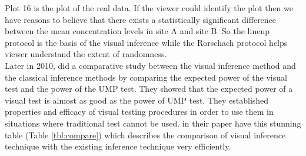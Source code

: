 \documentclass[12]{report}
\begin{document}
Plot 16 is the plot of the real data. If the viewer could identify the plot then we have reasons to believe that there exists a statistically significant difference between the mean concentration levels in site A and site B. So the lineup protocol is the basis of the visual inference while the Rorschach protocol helps viewer understand the extent of randomness. \\

Later in 2010, \cite{majumder:2010} did a comparative study between the visual inference method and the classical inference methods by comparing the expected power of the visual test and the power of the UMP test. They showed that the expected power of a visual test is almost as good as the power of UMP test. They established properties and efficacy of visual testing procedures in order to use them in situations where traditional test cannot be used. \cite{majumder:2010} in their paper have this stunning table (Table \ref{tbl:compare}) which describes the comparison of visual inference technique with the existing inference technique very efficiently. 

\end{document}
